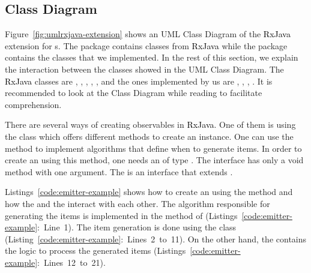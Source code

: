 \documentclass[type=bsc,accentcolor=tud9c]{tudthesis}
\newcommand{\framework}[1]{\textcolor{black}{#1}}
\begin{document}
\subsection{Class Diagram}

Figure~\ref{fig:umlrxjava-extension} shows an UML Class Diagram of the \framework{RxJava} extension for s. The package  contains classes from \framework{RxJava} while the package  contains the classes that we implemented. In the rest of this section, we explain the interaction between the classes showed in the UML Class Diagram. The \framework{RxJava} classes are , , , , , and the ones implemented by us are , , , . It is recommended to look at the Class Diagram while reading to facilitate comprehension.

There are several ways of creating observables in \framework{RxJava}. One of them is using the class  which offers different methods to create an  instance. One can use the method  to implement algorithms that define when to generate items. In order to create an  using this method, one needs an  of type . The  interface has only a void method with one argument. The  is an interface that extends .



Listings~\ref{code:emitter-example} shows how to create an  using the method  and how the  and the  interact with each other. The algorithm responsible for generating the items is implemented in the  method of  (Listings~\ref{code:emitter-example}:~Line~1). The item generation is done using the class  (Listing~\ref{code:emitter-example}:~Lines~2~to~11). On the other hand, the  contains the logic to process the generated items (Listings~\ref{code:emitter-example}:~Lines~12~to~21).
\end{document}
